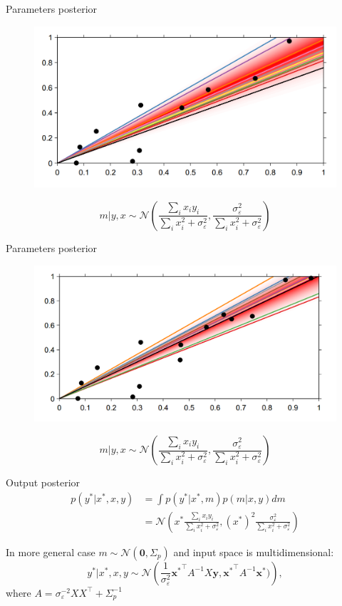\documentclass[12pt]{beamer}
\begin{document}
\begin{frame}{Parameters posterior}
\begin{figure}
\includegraphics[scale=0.4]{Bayesian_5.png} 
\end{figure}
$$m|y,x \sim \mathcal{N}\left(\frac{\sum_i x_i y_i}{\sum_i x_i^2 + \sigma_{\varepsilon}^2},\frac{\sigma_{\varepsilon}^2}{\sum_i x_i^2 + \sigma_{\varepsilon}^2}\right)$$
\end{frame}

\begin{frame}{Parameters posterior}
\begin{figure}
\includegraphics[scale=0.4]{Bayesian_6.png} 
\end{figure}
$$m|y,x \sim \mathcal{N}\left(\frac{\sum_i x_i y_i}{\sum_i x_i^2 + \sigma_{\varepsilon}^2},\frac{\sigma_{\varepsilon}^2}{\sum_i x_i^2 + \sigma_{\varepsilon}^2}\right)$$
\end{frame}

\begin{frame}{Output posterior}
\begin{align*}
    p(y^*|x^*,x,y)&=\int{p(y^*|x^*,m) p(m| x,y) dm} \\
    &= \mathcal{N}\left(x^* \frac{\sum_i x_i y_i}{\sum_i x_i^2 + \sigma_{\varepsilon}^2},(x^*)^2\frac{\sigma_{\varepsilon}^2}{\sum_i x_i^2 + \sigma_{\varepsilon}^2}\right)
\end{align*}
\pause

In more general case  $m \sim \mathcal{N}(\mathbf{0},\Sigma_p)$ and input space is multidimensional:
$$
y^*|x^*,x,y \sim \mathcal{N}\left(\frac{1}{\sigma_{\varepsilon}^2} \mathbf{x^*}^{\intercal} A^{-1} X \mathbf{y},\mathbf{x^*}^{\intercal} A^{-1}\mathbf{x^*})\right),
$$
where $A=\sigma_{\varepsilon}^{-2} X X^{\intercal} + \Sigma_p^{-1}$
\end{frame}
\end{document}
